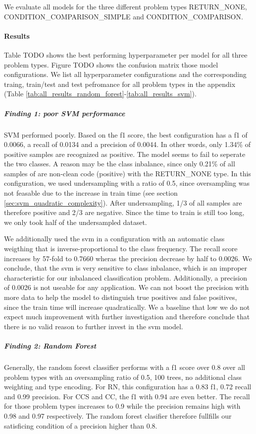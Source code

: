 We evaluate all models for the three different problem types RETURN\_NONE, CONDITION\_COMPARISON\_SIMPLE and CONDITION\_COMPARISON.

\paragraph{Results}
Table TODO shows the best performing hyperparameter per model for all three problem types. Figure TODO shows the confusion matrix those model configurations. We list all hyperparameter configurations and the corresponding traing, train/test and test pefromance for all problem types in the appendix (Table \ref{tab:all_results_random_forest}-\ref{tab:all_results_svm}).




\subparagraph{Finding 1: poor SVM performance}
SVM performed poorly. Based on the f1 score, the best configuration has a f1 of 0.0066, a recall of 0.0134 and a precision of 0.0044. In other words, only 1.34\% of positive samples are recognized as positive. The model seems to fail to seperate the two classes. A reason may be the class inbalance, since only 0.21\% of all samples of are non-clean code (positive) with the RETURN\_NONE type. In this configuration, we used undersampling with a ratio of 0.5, since oversampling was not feasable due to the increase in train time (see section \ref{sec:svm_quadratic_complexity}). After undersampling, 1/3 of all samples are therefore positive and 2/3 are negative. Since the time to train is still too long, we only took half of the undersampled dataset. 

We additionally used the svm in a configuration with an automatic class weigthing that is inverse-proportional to the class frequency. The recall score increases by 57-fold to 0.7660 wheras the precision decrease by half to 0.0026. We conclude, that the svm is very sensitive to class inbalance, which is an improper characteristic for our inbalanced classification problem. Additionally, a precision of 0.0026 is not useable for any application. We can not boost the precision with more data to help the model to distinguish true positives and false positives, since the train time will increase quadratically. We a baseline that low we do not expect much improvement with further investigation and therefore conclude that there is no valid reason to further invest in the svm model.


\subparagraph{Finding 2: Random Forest}
Generally, the random forest classifier performs with a f1 score over 0.8 over all problem types with an oversampling ratio of 0.5, 100 trees, no additional class weighting and type encoding. For RN, this configuration has a 0.83 f1, 0.72 recall and 0.99 precision. For CCS and CC, the f1 with 0.94 are even better. The recall for those problem types increases to 0.9 while the precision remains high with 0.98 and 0.97 respectively. The random forest clasifier therefore fullfills our satisficing condition of a precision higher than 0.8.

